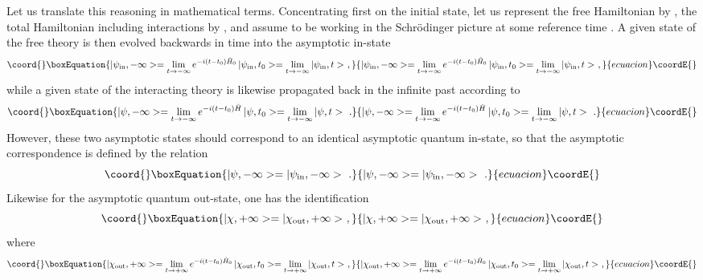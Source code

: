 \documentclass[a4paper,11pt]{article}
\begin{document}
Let us translate this reasoning in mathematical terms. Concentrating first on 
the initial state, let us represent the free Hamiltonian by \coordHE{}, 
the total Hamiltonian including interactions by \coordHE{}, and assume to be
working in the Schr\"odinger picture at some reference time \coordHE{}.
A given state \coordHE{} of the free theory is then evolved
backwards in time into the asymptotic in-state
\begin{equation}\coord{}\boxEquation{
|\psi_{\rm in},-\infty>=
\lim_{t\rightarrow -\infty}e^{-i(t-t_0)\hat{H}_0}\,|\psi_{\rm in},t_0>=
\lim_{t\rightarrow -\infty}|\psi_{\rm in},t>\ ,
}{
|\psi_{\rm in},-\infty>=
\lim_{t\rightarrow -\infty}e^{-i(t-t_0)\hat{H}_0}\,|\psi_{\rm in},t_0>=
\lim_{t\rightarrow -\infty}|\psi_{\rm in},t>\ ,
}{ecuacion}\coordE{}\end{equation}
while a given state \coordHE{} of the interacting theory is likewise
propagated back in the infinite past according to
\begin{equation}\coord{}\boxEquation{
|\psi,-\infty>=
\lim_{t\rightarrow -\infty}e^{-i(t-t_0)\hat{H}}\,|\psi,t_0>=
\lim_{t\rightarrow -\infty}|\psi,t>\ .
}{
|\psi,-\infty>=
\lim_{t\rightarrow -\infty}e^{-i(t-t_0)\hat{H}}\,|\psi,t_0>=
\lim_{t\rightarrow -\infty}|\psi,t>\ .
}{ecuacion}\coordE{}\end{equation}
However, these two asymptotic states should correspond to an identical
asymptotic quantum in-state, so that the asymptotic correspondence is
defined by the relation
\begin{equation}\coord{}\boxEquation{
|\psi,-\infty>=|\psi_{\rm in},-\infty>\ .
}{
|\psi,-\infty>=|\psi_{\rm in},-\infty>\ .
}{ecuacion}\coordE{}\end{equation}
Likewise for the asymptotic quantum out-state, one has the identification
\begin{equation}\coord{}\boxEquation{
|\chi,+\infty>=|\chi_{\rm out},+\infty>\ ,
}{
|\chi,+\infty>=|\chi_{\rm out},+\infty>\ ,
}{ecuacion}\coordE{}\end{equation}
where
\begin{equation}\coord{}\boxEquation{
|\chi_{\rm out},+\infty>=
\lim_{t\rightarrow +\infty}e^{-i(t-t_0)\hat{H}_0}\,|\chi_{\rm out},t_0>=
\lim_{t\rightarrow +\infty}|\chi_{\rm out},t>\ ,
}{
|\chi_{\rm out},+\infty>=
\lim_{t\rightarrow +\infty}e^{-i(t-t_0)\hat{H}_0}\,|\chi_{\rm out},t_0>=
\lim_{t\rightarrow +\infty}|\chi_{\rm out},t>\ ,
}{ecuacion}\coordE{}\end{equation}
\end{document}
